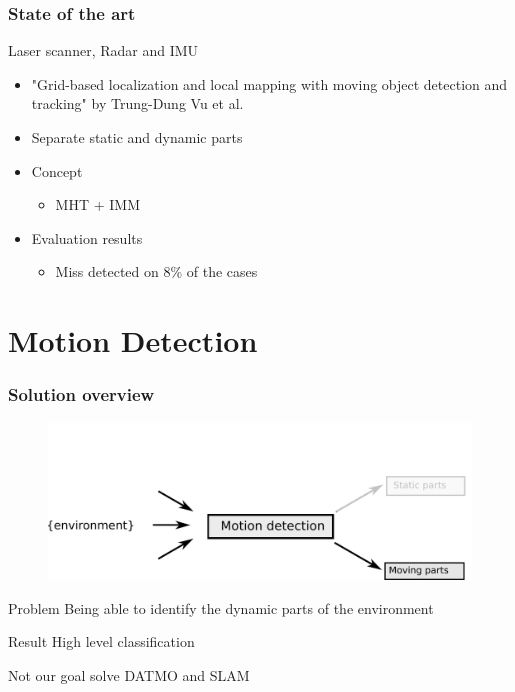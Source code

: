 \documentclass{beamer}
\begin{document}
	\begin{frame}
		\frametitle{State of the art}	
		\begin{block}{Laser scanner, Radar and IMU}
			\begin{itemize}
			\item "Grid-based localization and local mapping with moving object detection and tracking" by Trung-Dung Vu et al. 
			\item Separate static and dynamic parts
			\item Concept
				\begin{itemize}			
				\item MHT + IMM
				\end{itemize}		
			\item Evaluation results
				\begin{itemize}			
				\item Miss detected on 8\% of the cases
				\end{itemize}				
			\end{itemize}				
		\end{block}
	\end{frame}

\section{Motion Detection}

	\begin{frame}
		\frametitle{Solution overview}
		\begin{figure}[h]
			\center
			\includegraphics[scale=0.5]{img/fig:problem}
		 \end{figure}
		 
		\begin{block}{Problem}
			 Being able to identify the dynamic parts of the environment
		\end{block}
		 
		\begin{block}{Result}
			High level classification
		\end{block}				 

		\begin{alertblock}{Not our goal}
			solve DATMO and SLAM
		\end{alertblock}
	\end{frame}
\end{document}

